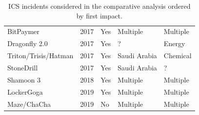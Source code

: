 \documentclass[runningheads]{llncs}
\begin{document}
\begin{table}[]
\begin{tabular}{|l|l|l|l|l|}
    BitPaymer                       & 2017                                       & Yes                                    & Multiple                                     & Multiple                             \\
    Dragonfly 2.0                   & 2017                                       & Yes                                    & ?                                            & Energy                               \\
    Triton/Trisis/Hatman            & 2017                                       & Yes                                    & Saudi Arabia                                 & Chemical                  \\
    StoneDrill                      & 2017                                       & Yes                                    & Saudi Arabia                                 & ?                                    \\
    Shamoon 3                       & 2018                                       & Yes                                    & Multiple                                     & Multiple                             \\
    LockerGoga                      & 2019                                       & Yes                                    & Multiple                                     & Multiple                             \\
    Maze/ChaCha                     & 2019                                       & No                                     & Multiple                                     & Multiple\\
    \hline
    \end{tabular}
    \medskip\medskip
    \caption{ICS incidents considered in the comparative analysis ordered by first impact.}
    \end{table}
\end{document}
